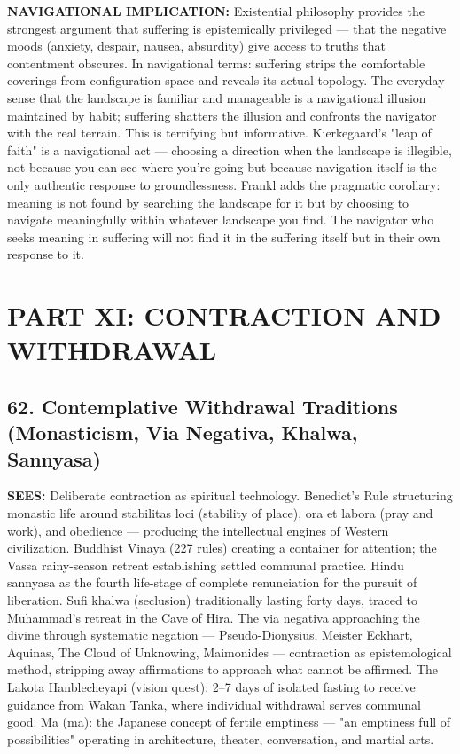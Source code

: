 \textbf{NAVIGATIONAL IMPLICATION:} Existential philosophy provides the strongest argument that suffering is epistemically privileged — that the negative moods (anxiety, despair, nausea, absurdity) give access to truths that contentment obscures. In navigational terms: suffering strips the comfortable coverings from configuration space and reveals its actual topology. The everyday sense that the landscape is familiar and manageable is a navigational illusion maintained by habit; suffering shatters the illusion and confronts the navigator with the real terrain. This is terrifying but informative. Kierkegaard's "leap of faith" is a navigational act — choosing a direction when the landscape is illegible, not because you can see where you're going but because navigation itself is the only authentic response to groundlessness. Frankl adds the pragmatic corollary: meaning is not found by searching the landscape for it but by choosing to navigate meaningfully within whatever landscape you find. The navigator who seeks meaning in suffering will not find it in the suffering itself but in their own response to it.


\bigskip\noindent\makebox[\textwidth]{\color{rulegray}\rule{5cm}{0.3pt}}\bigskip


\chapter*{PART XI: CONTRACTION AND WITHDRAWAL}


\section*{62. Contemplative Withdrawal Traditions (Monasticism, Via Negativa, Khalwa, Sannyasa)}


\textbf{SEES:} Deliberate contraction as spiritual technology. Benedict's Rule structuring monastic life around stabilitas loci (stability of place), ora et labora (pray and work), and obedience — producing the intellectual engines of Western civilization. Buddhist Vinaya (227 rules) creating a container for attention; the Vassa rainy-season retreat establishing settled communal practice. Hindu sannyasa as the fourth life-stage of complete renunciation for the pursuit of liberation. Sufi khalwa (seclusion) traditionally lasting forty days, traced to Muhammad's retreat in the Cave of Hira. The via negativa approaching the divine through systematic negation — Pseudo-Dionysius, Meister Eckhart, Aquinas, The Cloud of Unknowing, Maimonides — contraction as epistemological method, stripping away affirmations to approach what cannot be affirmed. The Lakota Hanblecheyapi (vision quest): 2–7 days of isolated fasting to receive guidance from Wakan Tanka, where individual withdrawal serves communal good. Ma ({ma}): the Japanese concept of fertile emptiness — "an emptiness full of possibilities" operating in architecture, theater, conversation, and martial arts.


